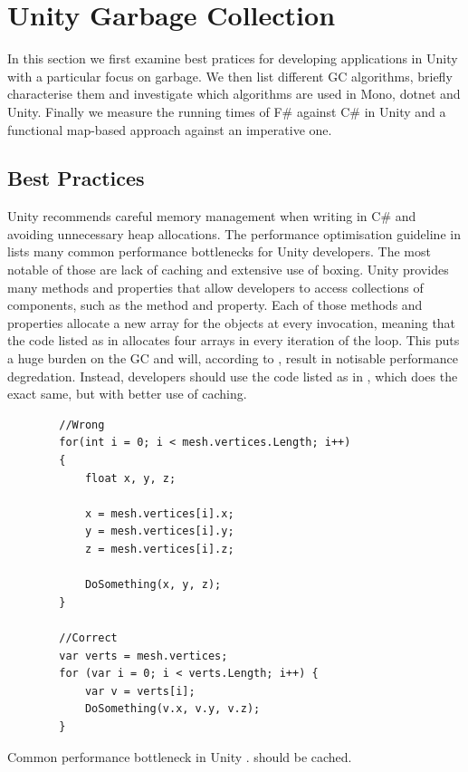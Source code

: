 \section{Unity Garbage Collection}
In this section we first examine best pratices for developing applications in Unity with a particular focus on garbage. We then list different \gls{GC} algorithms, briefly characterise them and investigate which algorithms are used in Mono, dotnet and Unity. Finally we measure the running times of F\# against C\# in Unity and a functional map-based approach against an imperative one.

\subsection{Best Practices}
Unity recommends careful memory management when writing in C\# and avoiding unnecessary heap allocations\cite{unity:optimisation}. The performance optimisation guideline in \cite{unity:optimisation} lists many common performance bottlenecks for Unity developers. The most notable of those are lack of caching and extensive use of boxing. Unity provides many methods and properties that allow developers to access collections of components, such as the  method and  property\cite{unity:optimisation, unity:heap}. Each of those methods and properties allocate a new array for the objects at every invocation, meaning that the code listed as  in  allocates four arrays in every iteration of the loop. This puts a huge burden on the \gls{GC} and will, according to \cite{unity:heap}, result in notisable performance degredation. Instead, developers should use the code listed as  in , which does the exact same, but with better use of caching.

\begin{listing}
    \begin{verbatim}
        //Wrong
        for(int i = 0; i < mesh.vertices.Length; i++)
        {
            float x, y, z;

            x = mesh.vertices[i].x;
            y = mesh.vertices[i].y;
            z = mesh.vertices[i].z;

            DoSomething(x, y, z);
        }

        //Correct
        var verts = mesh.vertices;
        for (var i = 0; i < verts.Length; i++) {
            var v = verts[i];
            DoSomething(v.x, v.y, v.z);
        }
    \end{verbatim}
    \caption{Common performance bottleneck in Unity \cite{unity:heap}.  should be cached.} \label{lst:unity:array:prop}
\end{listing}

